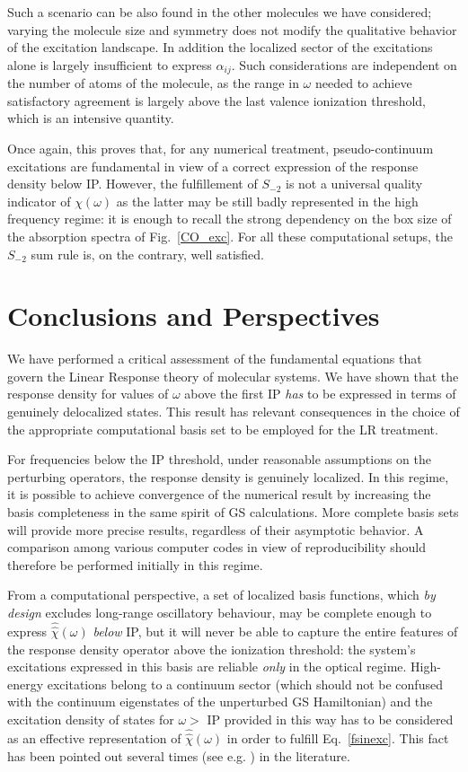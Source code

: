 \documentclass[reprint,aps,prb]{revtex4-1}
\newcommand{\op}[1]{\hat {#1}}
\newcommand{\sop}[1]{\op{\op {#1}}}
\begin{document}
Such a scenario can be also found in the other molecules we have considered;
varying the molecule size and symmetry does not modify the qualitative behavior of the excitation landscape. In addition the
localized sector of the excitations alone is largely insufficient to express $\alpha_{ij}$.
Such considerations are independent on the number of atoms of the molecule, as the range in $\omega$ needed to
achieve satisfactory agreement is largely above the last valence ionization threshold, which is
an intensive quantity.

Once again, this proves that, for any numerical treatment,  pseudo-continuum excitations are fundamental in view of a correct expression
of the response density below IP.
However, the fulfillement of $S_{-2}$ is not a universal quality indicator of $\chi(\omega)$ as the latter may be still badly represented in the high frequency regime:
it is enough to recall
the strong dependency on the box size of the absorption spectra of Fig.~\ref{CO_exc}.
For all these computational setups, the $S_{-2}$ sum rule is, on the contrary, well satisfied.

\section{Conclusions and Perspectives}

We have performed a critical assessment of the fundamental equations that govern the Linear Response theory of molecular systems.
We have shown that the response density for values of $\omega$ above the first IP \emph{has} to be expressed in terms of genuinely delocalized states.
This result has relevant consequences in the choice of the  appropriate computational basis set to be employed for the LR treatment.

For frequencies below the IP threshold, under reasonable assumptions on the perturbing operators, the response density is genuinely localized.
In this regime, it is possible to achieve convergence of the numerical result by increasing the basis completeness in the same spirit of GS calculations.
More complete basis sets will provide more precise results, regardless of their asymptotic behavior. A comparison among various computer codes in view of reproducibility should therefore be performed initially in this regime.

From a computational perspective, a set of localized basis functions, which \emph{by design} excludes long-range oscillatory behaviour, may be complete
enough to express $\sop \chi(\omega)$ \emph{below} IP, but it will never be able to capture the entire features of the response density operator above
the ionization threshold: the system's excitations expressed in this basis are reliable \emph{only} in the optical regime.
High-energy excitations belong to a continuum sector (which should not be confused with the continuum eigenstates of the unperturbed GS Hamiltonian)
and the excitation density of states for $\omega >$ IP provided in this way has to be considered as an effective representation of $\sop \chi(\omega)$ in order to fulfill Eq.~\eqref{fsinexc}. This fact has been pointed out several times (see e.g. \cite{giustino2012,giustino2014}) in the literature.
\end{document}

